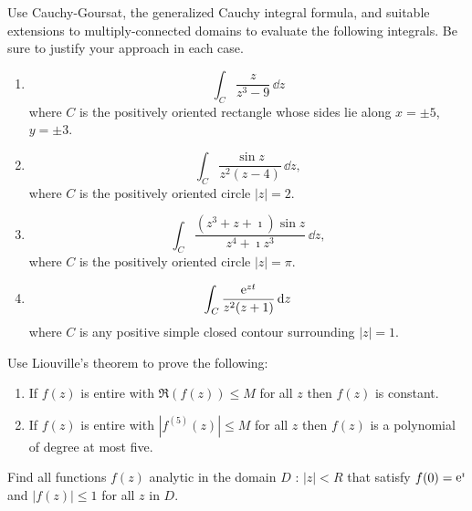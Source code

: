 {\begin{Exercise}
  Use Cauchy-Goursat, the generalized Cauchy integral formula, and suitable 
  extensions to multiply-connected domains to evaluate the following integrals.
  Be sure to justify your approach in each case.
  \begin{enumerate}
  \item 
    \[
    \int_C \frac{z}{z^3 - 9}\,\dd z
    \]
    where $C$ is the positively oriented rectangle whose sides lie along
    $x = \pm 5$, $y = \pm 3$.
  \item 
    \[
    \int_C \frac{\sin z}{z^2 (z - 4)}\,\dd z,
    \]
    where $C$ is the positively oriented circle $|z| = 2$.
  \item 
    \[
    \int_C \frac{(z^3 + z + \imath) \sin z}{z^4 + \imath z^3}\,\dd z,
    \]
    where $C$ is the positively oriented circle $|z| = \pi$.
  \item 
    \[
    \int_C \frac{\mathop{\mathrm{e}}\nolimits^{z t}}{z^2 (z + 1)}\,\mathrm{d} z
    \]
    where $C$ is any positive simple closed contour surrounding $|z| = 1$.
  \end{enumerate}
\end{Exercise}








\begin{Exercise}
  Use Liouville's theorem to prove the following:
  \begin{enumerate}
  \item 
    If $f(z)$ is entire with $\Re(f(z)) \leq M$ for all 
    $z$ then $f(z)$ is constant.
  \item 
    If $f(z)$ is entire with $|f^{(5)}(z)| \leq M$ for all $z$
    then $f(z)$ is a polynomial of degree at most five.
  \end{enumerate}
\end{Exercise}







\begin{Exercise}
  Find all functions $f(z)$ analytic in the domain $D$ : $|z| < R$ 
  that satisfy $f(0) = \mathop{\mathrm{e}}\nolimits^\imath$ and $|f(z)| \leq 1$ for all $z$ in $D$.
\end{Exercise}








}
